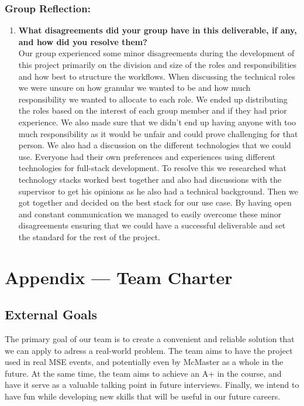 \documentclass{article}
\begin{document}
\subsubsection*{Group Reflection:}
\begin{enumerate}
  \item \textbf{What disagreements did your group have in this deliverable, if any, and how did you resolve them?} \\
  Our group experienced some minor disagreements during the development of this project primarily on the division and size of the roles and responsibilities and how best to structure the workflows. When discussing the technical roles we were unsure on how granular we wanted to be and how much responsibility we wanted to allocate to each role. We ended up distributing the roles based on the interest of each group member and if they had prior experience. We also made sure that we didn't end up having anyone with too much responsibility as it would be unfair and could prove challenging for that person. We also had a discussion on the different technologies that we could use. Everyone had their own preferences and experiences using different technologies for full-stack development. To resolve this we researched what technology stacks worked best together and also had discussions with the supervisor to get his opinions as he also had a technical background. Then we got together and decided on the best stack for our use case. By having open and constant communication we managed to easily overcome these minor disagreements ensuring that we could have a successful deliverable and set the standard for the rest of the project.
\end{enumerate}
\newpage{}

\section*{Appendix --- Team Charter}


\subsection*{External Goals}

The primary goal of our team is to create a convenient and reliable solution that we can apply to adress a real-world problem. The team aims to have the project used in real MSE events, and potentially even by McMaster as a whole in the future. At the same time, the team aims to achieve an A+ in the course, and have it serve as a valuable talking point in future interviews. Finally, we intend to have fun while developing new skills that will be useful in our future careers.
\end{document}
